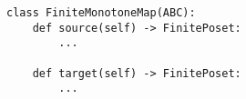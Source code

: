 \begin{verbatim}
class FiniteMonotoneMap(ABC):
    def source(self) -> FinitePoset:
        ...

    def target(self) -> FinitePoset:
        ...
\end{verbatim}